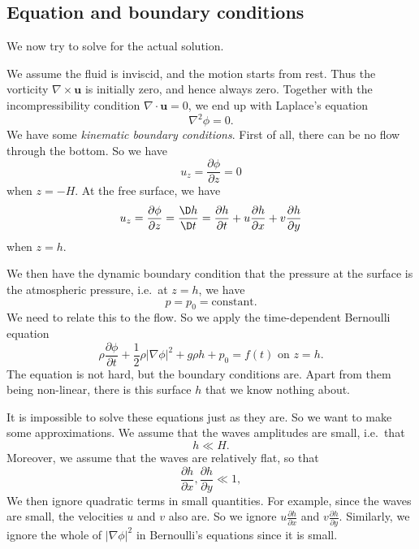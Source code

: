 \documentclass[a4paper]{article}
\begin{document}
\subsection{Equation and boundary conditions}
We now try to solve for the actual solution.
\begin{center}
\end{center}
We assume the fluid is inviscid, and the motion starts from rest. Thus the vorticity $\nabla \times \mathbf{u}$ is initially zero, and hence always zero. Together with the incompressibility condition $\nabla \cdot \mathbf{u} = 0$, we end up with Laplace's equation
\[
  \nabla^2 \phi = 0.
\]
We have some \emph{kinematic boundary conditions}. First of all, there can be no flow through the bottom. So we have
\[
  u_z = \frac{\partial \phi}{\partial z} = 0
\]
when $z = -H$. At the free surface, we have
\[
  u_z = \frac{\partial \phi}{\partial z} = \frac{\D h}{\D t} = \frac{\partial h}{\partial t} + u \frac{\partial h}{\partial x} + v \frac{\partial h}{\partial y}
\]
when $z = h$.

We then have the dynamic boundary condition that the pressure at the surface is the atmospheric pressure, i.e.\ at $z = h$, we have
\[
  p = p_0 = \text{constant}.
\]
We need to relate this to the flow. So we apply the time-dependent Bernoulli equation
\[
  \rho \frac{\partial \phi}{\partial t} + \frac{1}{2} \rho|\nabla \phi|^2 + g\rho h + p_0 = f(t)\text{ on }z = h.
\]
The equation is not hard, but the boundary conditions are. Apart from them being non-linear, there is this surface $h$ that we know nothing about.

It is impossible to solve these equations just as they are. So we want to make some approximations. We assume that the waves amplitudes are small, i.e.\ that
\[
  h \ll H.
\]
Moreover, we assume that the waves are relatively flat, so that
\[
  \frac{\partial h}{\partial x},\frac{\partial h}{\partial y} \ll 1,
\]
We then ignore quadratic terms in small quantities. For example, since the waves are small, the velocities $u$ and $v$ also are. So we ignore $u \frac{\partial h}{\partial x}$ and $v\frac{\partial h}{\partial y}$. Similarly, we ignore the whole of $|\nabla \phi|^2$ in Bernoulli's equations since it is small.
\end{document}
